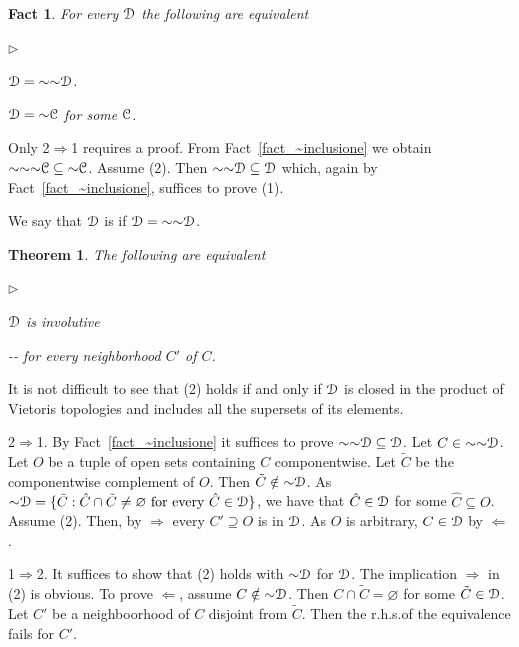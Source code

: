 \documentclass{amsproc}
\makeatletter
\newcommand{\mylabel}[1]{{#1}\hfill}
\renewenvironment{itemize}
  {\begin{list}{$\triangleright$}{%
  \setlength{\parskip}{0mm}
  \setlength{\topsep}{.1\baselineskip}
  \setlength{\rightmargin}{0mm}
  \setlength{\listparindent}{0mm}
  \setlength{\itemindent}{0mm}
  \setlength{\labelwidth}{3ex}
  \setlength{\itemsep}{.1\baselineskip}
  \setlength{\parsep}{.1\baselineskip}
  \setlength{\partopsep}{0mm}
  \setlength{\labelsep}{1ex}
  \setlength{\leftmargin}{\labelwidth+\labelsep}
  \let\makelabel\mylabel}}{%
\end{list}}
\newcounter{thm}
\theoremstyle{mio}
\newtheorem{theorem}[thm]{Theorem}\tcolorboxenvironment{theorem}{mythm}
\newtheorem{fact}[thm]{Fact}\tcolorboxenvironment{fact}{mythm}
\providecommand{\proofNameStyle}{\bfseries}
\renewenvironment{proof}[1][\proofname]{\par
  \pushQED{\qed}%
  \normalfont%
  \trivlist
  \item[\hskip\labelsep
        \proofNameStyle
    #1\@addpunct{.}]\ignorespaces
}{%
  \popQED\endtrivlist\@endpefalse
}
\renewcommand*{\emph}[1]{%
   \smash{\tikz[baseline]\node[rectangle, fill=teal!25, rounded corners, inner xsep=0.5ex, inner ysep=0.2ex, anchor=base, minimum height = 2.7ex]{\strut #1};}}
\makeatother
\begin{document}
\begin{fact}
  For every ${\EuScript D}$ the following are equivalent
  \begin{itemize}
    \item [1.] ${\EuScript D}={\sim}{\sim}{\EuScript D}$.
    \item [2.] ${\EuScript D}={\sim}{\EuScript C}$ for some ${\EuScript C}$.
  \end{itemize}
\end{fact}
  
\begin{proof}
  Only 2$\Rightarrow$1 requires a proof.
  From Fact~\ref{fact_~inclusione} we obtain ${\sim}{\sim}{\sim}{\EuScript C}\subseteq{\sim}{\EuScript C}$.
  Assume (2).
  Then ${\sim}{\sim}{\EuScript D}\subseteq{\EuScript D}$ which, again by Fact~\ref{fact_~inclusione}, suffices to prove (1).
\end{proof}

We say that ${\EuScript D}$ is \emph{involutive\/} if ${\EuScript D}={\sim}{\sim}{\EuScript D}$.

\begin{theorem}
  The following are equivalent
  \begin{itemize}
    \item [1.] ${\EuScript D}$ is involutive 
    \item [2.] \noindent\kern-\kern-
     for every neighborhood $C'$ of $C$.
  \end{itemize}
\end{theorem}

It is not difficult to see that (2) holds if and only if ${\EuScript D}$ is closed in the product of Vietoris topologies and includes all the supersets of its elements.

\begin{proof}
  2$\Rightarrow$1.
  By Fact~\ref{fact_~inclusione} it suffices to prove ${\sim}{\sim}{\EuScript D}\subseteq{\EuScript D}$.
  Let $C\in{\sim}{\sim}{\EuScript D}$.
  Let $O$ be a tuple of open sets containing $C$ componentwise.
  Let $\tilde C$ be the componentwise complement of $O$.  
  Then $\tilde C\notin{\sim}{\EuScript D}$.
  As ${\sim}{\EuScript D}=\{\tilde C:  \hat C\cap\tilde C\neq\varnothing\text{ for every }\hat C\in{\EuScript D}\}$, we have that $\hat C\in{\EuScript D}$ for some $\hat C\subseteq O$.
  Assume (2).
  Then, by $\Rightarrow$ every $C'\supseteq O$ is in ${\EuScript D}$.
  As $O$ is arbitrary, $C\in {\EuScript D}$ by $\Leftarrow$.

  1$\Rightarrow$2.
  It suffices to show that (2) holds with ${\sim}{\EuScript D}$ for ${\EuScript D}$.
  The implication $\Rightarrow$ in (2) is obvious.
  To prove $\Leftarrow$, assume $C\notin{\sim}{\EuScript D}$.
  Then $C\cap\tilde C=\varnothing$ for some $\tilde C\in{\EuScript D}$.
  Let $C'$ be a neighboorhood of $C$ disjoint from $\tilde C$.
  Then the r.h.s.\@ of the equivalence fails for $C'$.  
\end{proof}
\end{document}
